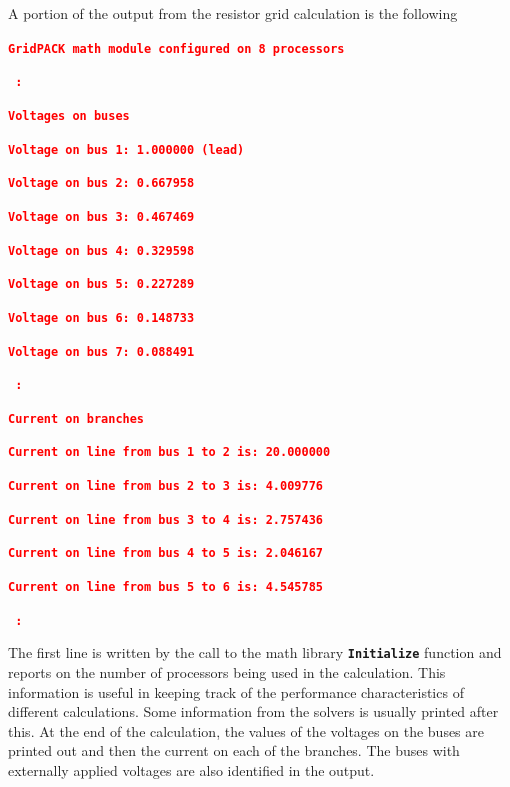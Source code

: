 \documentclass[12pt]{report} %
\begin{document}
A portion of the output from the resistor grid calculation is the following

\textcolor{red}{\texttt{\textbf{GridPACK math module configured on 8 processors}}}

\textcolor{red}{\texttt{\textbf{    :}}}

\textcolor{red}{\texttt{\textbf{Voltages on buses}}}

\textcolor{red}{\texttt{\textbf{}}}

\textcolor{red}{\texttt{\textbf{Voltage on bus 1:     1.000000 (lead)}}}

\textcolor{red}{\texttt{\textbf{Voltage on bus 2:     0.667958}}}

\textcolor{red}{\texttt{\textbf{Voltage on bus 3:     0.467469}}}

\textcolor{red}{\texttt{\textbf{Voltage on bus 4:     0.329598}}}

\textcolor{red}{\texttt{\textbf{Voltage on bus 5:     0.227289}}}

\textcolor{red}{\texttt{\textbf{Voltage on bus 6:     0.148733}}}

\textcolor{red}{\texttt{\textbf{Voltage on bus 7:     0.088491}}}

\textcolor{red}{\texttt{\textbf{    :}}}

\textcolor{red}{\texttt{\textbf{Current on branches}}}

\textcolor{red}{\texttt{\textbf{}}}

\textcolor{red}{\texttt{\textbf{Current on line from bus 1 to 2 is:    20.000000}}}

\textcolor{red}{\texttt{\textbf{Current on line from bus 2 to 3 is:     4.009776}}}

\textcolor{red}{\texttt{\textbf{Current on line from bus 3 to 4 is:     2.757436}}}

\textcolor{red}{\texttt{\textbf{Current on line from bus 4 to 5 is:     2.046167}}}

\textcolor{red}{\texttt{\textbf{Current on line from bus 5 to 6 is:     4.545785}}}

\textcolor{red}{\texttt{\textbf{    :}}}

The first line is written by the call to the math library \texttt{\textbf{Initialize}} function and reports on the number of processors being used in the calculation. This information is useful in keeping track of the performance characteristics of different calculations. Some information from the solvers is usually printed after this. At the end of the calculation, the values of the voltages on the buses are printed out and then the current on each of the branches. The buses with externally applied voltages are also identified in the output.
\end{document}
